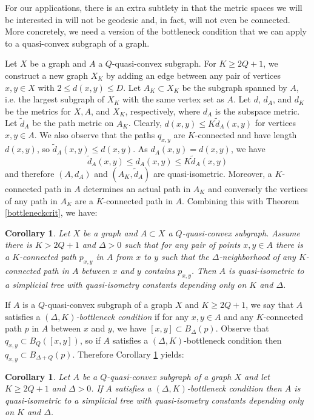 \documentclass[11pt]{article}
\newtheorem{cor}[thm]{Corollary}
\theoremstyle{remark}
\begin{document}
For our applications, there is an extra subtlety in that the metric spaces we will be interested in will not be geodesic and, in fact, will not even be connected. More concretely, we need a version of the bottleneck condition that we can apply to a quasi-convex subgraph of a graph.

Let $X$ be a graph and $A$ a $Q$-quasi-convex subgraph. For $K \ge 2Q+1$, we construct a new graph $X_K$ by adding an edge between any pair of vertices $x, y \in X$ with $2\le d(x,y) \le D$. Let $A_K \subset X_K$ be the subgraph spanned by $A$, i.e. the largest subgraph of $X_K$ with the same vertex set as $A$. Let $d$, $d_A$, and $d_K$ be the metrics for $X,A$, and $X_K$, respectively, where $d_A$ is the subspace metric. Let $\tilde d_A$ be the path metric on $A_K$. Clearly, $d(x,y) \le K\tilde d_A(x,y)$ for vertices $x,y \in A$. We also observe that the paths $q_{x,y}$ are $K$-connected and have length $d(x,y)$, so $\tilde d_A(x,y) \le d(x,y)$.
As $d_A(x,y) = d(x,y)$, we have
$$\tilde d_A(x,y) \le  d_A(x,y) \le K\tilde d_A(x,y)$$
and therefore $(A, d_A)$ and $(A_K, \tilde d_A)$ are quasi-isometric. Moreover, a $K$-connected path in $A$ determines an actual path in $A_K$ and conversely the vertices of any path in $A_K$ are a $K$-connected path in $A$. Combining this with Theorem \ref{bottleneckcrit}, we have:

\begin{cor}\label{subspacebottleneck}
Let $X$ be a graph and $A\subset X$ a $Q$-quasi-convex subgraph. Assume there is $K>2Q+1$ and $\Delta>0$ such that for any pair of points $x,y \in A$ there is a $K$-connected path $p_{x,y}$ in $A$ from $x$ to $y$ such that the $\Delta$-neighborhood of any $K$-connected path in $A$ between $x$ and $y$ contains $p_{x,y}$. Then $A$ is quasi-isometric to a simplicial tree with quasi-isometry constants depending only on $K$ and $\Delta$.
\end{cor}

If $A$ is a $Q$-quasi-convex subgraph of a graph $X$ and $K \ge 2Q+1$, we say that $A$ satisfies a \emph{$(\Delta,K)$-bottleneck condition} if for any $x,y \in A$ and any $K$-connected path $p$ in $A$ between $x$ and $y$, we have $[x,y] \subset B_\Delta(p)$. Observe that $q_{x,y}\subset B_Q([x,y])$, so if $A$ satisfies a $(\Delta,K)$-bottleneck condition then $q_{x,y} \subset B_{\Delta +Q}(p)$. Therefore Corollary \ref{subspacebottleneck} yields:
\begin{cor}\label{geodesic_bottleneck}
Let $A$ be a $Q$-quasi-convex subgraph of a graph $X$ and let $K \ge 2Q+1$ and $\Delta>0$. If $A$ satisfies a
$(\Delta, K)$-bottleneck condition then $A$ is quasi-isometric to a simplicial tree with quasi-isometry constants depending only on $K$ and $\Delta$.
\end{cor}
\end{document}
